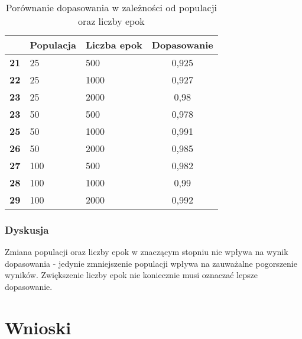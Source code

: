 \documentclass{classrep}
\begin{document}
\begin{table}[H]
\centering
\begin{tabular}{|l|l|l|c|}
\hline
            & \multicolumn{1}{c|}{\textbf{Populacja}} & \multicolumn{1}{c|}{\textbf{Liczba epok}} & \textbf{Dopasowanie} \\ \hline
\textbf{21} & 25                                      & 500                                       & 0,925                \\ \hline
\textbf{22} & 25                                      & 1000                                      & 0,927                \\ \hline
\textbf{23} & 25                                      & 2000                                      & 0,98                 \\ \hline
\textbf{23} & 50                                      & 500                                       & 0,978                \\ \hline
\textbf{25} & 50                                      & 1000                                      & 0,991                \\ \hline
\textbf{26} & 50                                      & 2000                                      & 0,985                \\ \hline
\textbf{27} & 100                                     & 500                                       & 0,982                \\ \hline
\textbf{28} & 100                                     & 1000                                      & 0,99                 \\ \hline
\textbf{29} & 100                                     & 2000                                      & 0,992                \\ \hline
\end{tabular}
\caption{Porównanie dopasowania w zależności od populacji oraz liczby epok}
\label{tab:calc5}
\end{table}

\subsubsection*{Dyskusja}

Zmiana populacji oraz liczby epok w znaczącym stopniu nie wpływa na wynik dopasowania - jedynie zmniejszenie populacji wpływa na zauważalne pogorszenie wyników. Zwiększenie liczby epok nie koniecznie musi oznaczać lepsze dopasowanie.


\section{Wnioski}
\end{document}
